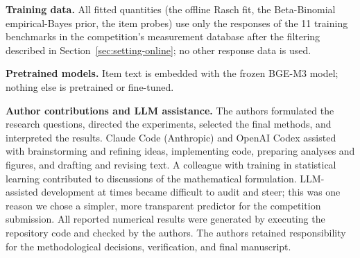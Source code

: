 \label{sec:disclosure-rerun}
\textbf{Training data.} All fitted quantities (the offline Rasch fit, the Beta-Binomial
empirical-Bayes prior, the item probes) use only the responses of the 11 training benchmarks in
the competition's measurement database after the filtering described in Section~\ref{sec:setting-online};
no other response data is used.

\textbf{Pretrained models.} Item text is embedded with the frozen
BGE-M3 model; nothing else is pretrained or fine-tuned.

\textbf{Author contributions and LLM assistance.} The authors formulated the research questions,
directed the experiments, selected the final methods, and interpreted the results. Claude Code
(Anthropic) and OpenAI Codex assisted with brainstorming and refining ideas, implementing code,
preparing analyses and figures, and drafting and revising text. A colleague with training in
statistical learning contributed to discussions of the mathematical formulation. LLM-assisted
development at times became difficult to audit and steer; this was one reason we chose a simpler,
more transparent predictor for the competition submission. All reported numerical results were
generated by executing the repository code and checked by the authors. The authors retained
responsibility for the methodological decisions, verification, and final manuscript.
